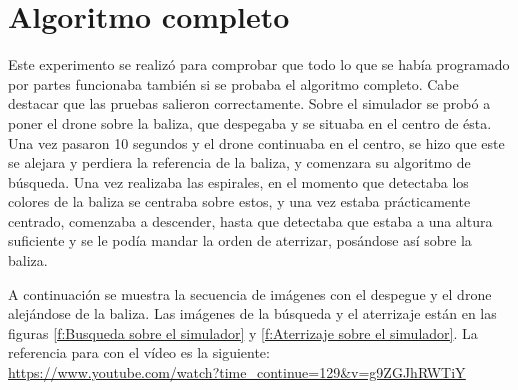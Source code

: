 \section{Algoritmo completo}\label{sec.algoritmocompleto}
\hspace{1cm} Este experimento se realiz\'o para comprobar que todo lo que se hab\'ia programado por partes funcionaba tambi\'en si se probaba el algoritmo completo. Cabe destacar que las pruebas salieron correctamente. Sobre el simulador se prob\'o a poner el drone sobre la baliza, que despegaba y se situaba en el centro de \'esta. Una vez pasaron 10 segundos y el drone continuaba en el centro, se hizo que este se alejara y perdiera la referencia de la baliza, y comenzara su algoritmo de b\'usqueda. Una vez realizaba las espirales, en el momento que detectaba los colores de la baliza se centraba sobre estos, y una vez estaba pr\'acticamente centrado, comenzaba a descender, hasta que detectaba que estaba a una altura suficiente y se le pod\'ia mandar la orden de aterrizar, pos\'andose as\'i sobre la baliza. 

A continuaci\'on se muestra la secuencia de im\'agenes con el despegue y el drone alej\'andose de la baliza. Las im\'agenes de la b\'usqueda y el aterrizaje est\'an en las figuras \ref{f:Busqueda sobre el simulador} y \ref{f:Aterrizaje sobre el simulador}. La referencia para con el v\'ideo es la siguiente:\\
\underline{\url{https://www.youtube.com/watch?time_continue=129&v=g9ZGJhRWTiY}}


